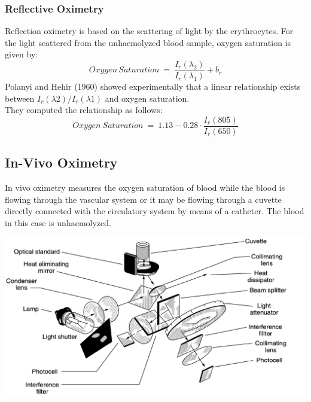 \documentclass{article}
\begin{document}
\subsubsection{Reflective Oximetry}
Reflection oximetry is based on the scattering of light by the erythrocytes. For the light scattered from the unhaemolyzed blood sample, oxygen saturation is given by:
\begin{equation}
    Oxygen\, Saturation\: = \: \frac{I_r (\lambda_2)}{I_r (\lambda_1)} + b_r
\end{equation}
Polanyi and Hehir (1960) showed experimentally that a linear relationship exists between $I_r(\lambda2)/I_r(\lambda1)$ and oxygen saturation.\\
They computed the relationship as follows:
\begin{equation}
    Oxygen\: Saturation \: = \: 1.13 - 0.28 \cdot \frac{I_r (805)}{I_r (650)}
\end{equation}
\newpage
\subsection{In-Vivo Oximetry}
In vivo oximetry measures the oxygen saturation of blood while the blood is flowing through the vascular system or it may be flowing through a cuvette directly connected with the circulatory system by means of a catheter. The blood in this case is unhaemolyzed.
\begin{center}
    \includegraphics[scale=0.3]{Screenshot 2023-05-04 at 6.54.44 PM.png}
\end{center}
\end{document}
